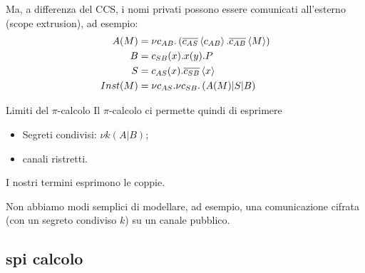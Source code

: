 \begin{frame}
  Ma, a differenza del CCS, i nomi privati possono essere comunicati
  all'esterno (scope extrusion), ad esempio:
  \begin{align*}
    A(M) & = \nu
           c_{AB}. \left(\overline{c_{AS}}\left<c_{AB}\right>. \overline{c_{AB}}\left<M\right>\right)
    \\
    B & = c_{SB}(x). x(y) .P \\
    S & = c_{AS}(x) . \overline{c_{SB}} \left<x\right> \\
    Inst(M) & = \nu c_{AS}. \nu c_{SB}. \left( A(M) | S | B\right)
  \end{align*}
  \begin{center}
  \end{center}
\end{frame}

\begin{frame}{Limiti del $\pi$-calcolo}
  Il $\pi$-calcolo ci permette quindi di esprimere
  \begin{itemize}
  \item Segreti condivisi: $\nu k ( A|B)$;
  \item canali ristretti.
  \end{itemize}
  I nostri termini esprimono le coppie. 
  \vfill

  Non abbiamo modi semplici di modellare, ad esempio, una
  comunicazione cifrata (con un segreto condiviso $k$) su un canale
  pubblico.
\end{frame}

\subsection{spi calcolo}

